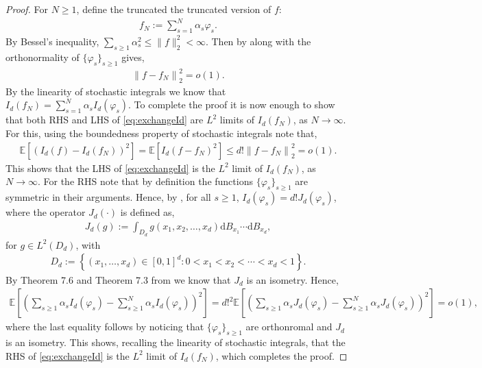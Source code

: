 \documentclass[11pt,reqno]{amsart}
\numberwithin{equation}{section}
\newcommand{\E}{\mathbb{E}}
\theoremstyle{definition}
\begin{document}
\begin{proof}
    For $N \geq 1$, define the truncated the truncated version of $f$:  
    \begin{align*}
        f_{N} := \sum_{s=1}^{N}\alpha_{s}\varphi_{s}.
    \end{align*} 
    By Bessel's inequality, $\sum_{s\geq 1}\alpha_{s}^2\leq \|f\|^2_2 <\infty$.
    Then by \cite[Lemma 6.8]{laxfunctional} along with the orthonormality of $\{\varphi_{s}\}_{s\geq 1}$ gives,
    \begin{align*}
        \left\|f-f_{N}\right\|_2^2 = o(1).
    \end{align*}
    By the linearity of stochastic integrals we know that $I_{d}(f_{N}) = \sum_{s=1}^{N}\alpha_{s}I_{d}(\varphi_{s})$. To complete the proof it is now enough to show that both RHS and LHS of \eqref{eq:exchangeId} are $L^{2}$ limits of $I_{d}(f_{N})$,  as $N\rightarrow\infty$. For this, using the boundedness property of stochastic integrals note that,
    \begin{align*}
        \E\left[\left(I_{d}(f) - I_{d}(f_{N})\right)^2\right] = \E\left[I_{d}(f - f_{N})^2\right] \leq d!\left\|f-f_{N}\right\|_2^2 = o(1).
    \end{align*}
    This shows that the LHS of \eqref{eq:exchangeId} is the $L^{2}$ limit of $I_{d}(f_{N})$, as $N\rightarrow\infty$. For the RHS note that by definition the functions $\{\varphi_{s}\}_{s\geq 1}$ are symmetric in their arguments. Hence, by \cite[Theorem 7.29]{gaussianhilbert}, for all $s\geq 1$, $I_{d}(\varphi_{s}) = d!J_{d}(\varphi_{s})$, where
    the operator $J_{d}(\cdot)$ is defined as, 
    \begin{align*}
        J_{d}(g) := \int_{D_{d}}g(x_{1},x_{2},\ldots,x_{d})\mathrm{d} B_{x_{1}}\cdots\mathrm{d} B_{x_{d}},  
    \end{align*}
   for $g\in L^{2}(D_{d})$, with 
    \begin{align*}
        D_{d} := \left\{(x_{1},\ldots,x_{d})\in [0,1]^d:0< x_{1}<x_{2}<\cdots<x_{d}< 1\right\}.
    \end{align*}
    By Theorem 7.6 and Theorem 7.3 from \cite{gaussianhilbert} we know that $J_{d}$ is an isometry. Hence,
    \begin{align*}
        \E\left[\left(\sum_{s\geq 1}\alpha_{s}I_{d}(\varphi_{s}) - \sum_{s\geq 1}^{N}\alpha_{s}I_{d}(\varphi_{s})\right)^2\right] = d!^2\E\left[\left(\sum_{s\geq 1}\alpha_{s}J_{d}(\varphi_{s}) - \sum_{s\geq 1}^{N}\alpha_{s}J_{d}(\varphi_{s})\right)^2\right] = o(1) , 
    \end{align*}
    where the last equality follows by noticing that $\{\varphi_{s}\}_{s\geq 1}$ are orthonromal and $J_{d}$ is an isometry. This shows, recalling the linearity of stochastic integrals, that the RHS of \eqref{eq:exchangeId} is the $L^2$ limit of $I_{d}(f_{N})$, which completes the proof.
\end{proof}
\end{document}
